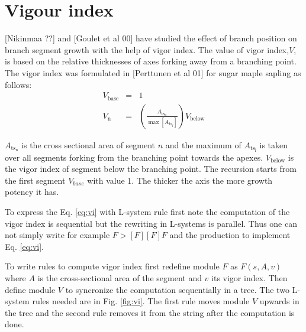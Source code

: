 \section{Vigour index}\label{sec:vi}
[Nikinmaa ??] and [Goulet et al  00] have studied the effect of branch
position on branch  segment growth with the help  of vigor index.  The
value of vigor index,$V$, is based on the relative thicknesses of axes
forking away from a branching point. The vigor index was formulated in
[Perttunen et al 01] for sugar maple sapling as follows:
\begin{eqnarray}
  \label{eq:vi}
  V_{\mathrm{base}} & = & 1 \nonumber \\
  V_{\mathrm{n}} & = & \left(\frac{A_{\mathrm{ts_{n}}}}{\max\left[A_{\mathrm{ts_{i}}}\right]}\right) V_{\mathrm{below}}
\end{eqnarray}

$A_{\mathrm{ts_{n}}}$ is  the cross sectional area of  segment $n$ and
the  maximum  of  $A_{\mathrm{ts_{i}}}$  is taken  over  all  segments
forking    from   the    branching   point    towards    the   apexes.
$V_\mathrm{below}$ is  the vigor index of segment  below the branching
point.  The  recursion starts from  the first segment  $V_{base}$ with
value 1. The thicker the axis the more growth potency it has.

To  express the  Eq.  \ref{eq:vi}  with L-system  rule first  note the
computation  of the  vigor index  is sequential  but the  rewriting in
L-systems is parallel. Thus one can  not simply write for example $F >
\left[F\right] \left[F\right]  F$ and  the production  to implement
Eq. \ref{eq:vi}.

To write  rules to  compute vigor index  first redefine module  $F$ as
$F(s,A,v)$ where  $A$ is the  cross-sectional area of the  segment and
$v$  its  vigor index.   Then  define  module  $V$ to  syncronize  the
computation sequentially in a tree.  The two L-system rules needed are
in Fig. \ref{fig:vi}.  The first rule moves module  $V$ upwards in the
tree  and  the  second rule  removes  it  from  the string  after  the
computation is done.


